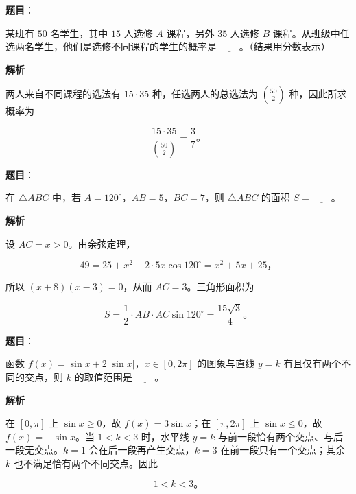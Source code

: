 \begin{answer}

\textbf{题目}：

某班有 $50$ 名学生，其中 $15$ 人选修 $A$ 课程，另外 $35$ 人选修 $B$ 课程。从班级中任选两名学生，他们是选修不同课程的学生的概率是 $\underline{\qquad}$。（结果用分数表示）

\textbf{解析}

两人来自不同课程的选法有 $15\cdot35$ 种，任选两人的总选法为 $\binom{50}{2}$ 种，因此所求概率为

\nopagebreak[4]
\[
\frac{15\cdot35}{\binom{50}{2}}=\frac37\mbox{。}
\]


\end{answer}
\begin{answer}

\textbf{题目}：

在 $\triangle ABC$ 中，若 $A=120^\circ$，$AB=5$，$BC=7$，则 $\triangle ABC$ 的面积 $S=\underline{\qquad}$。

\textbf{解析}

设 $AC=x>0$。由余弦定理，

\nopagebreak[4]
\[
49=25+x^2-2\cdot5x\cos120^\circ=x^2+5x+25\text{，}
\]

所以 $(x+8)(x-3)=0$，从而 $AC=3$。三角形面积为

\nopagebreak[4]
\[
S=\frac12\cdot AB\cdot AC\sin120^\circ=\frac{15\sqrt3}{4}\mbox{。}
\]


\end{answer}
\begin{answer}

\textbf{题目}：

函数 $f(x)=\sin x+2|\sin x|$，$x\in[0,2\pi]$ 的图象与直线 $y=k$ 有且仅有两个不同的交点，则 $k$ 的取值范围是 $\underline{\qquad}$。

\textbf{解析}

在 $[0,\pi]$ 上 $\sin x\ge0$，故 $f(x)=3\sin x$；在 $[\pi,2\pi]$ 上 $\sin x\le0$，故 $f(x)=-\sin x$。当 $1<k<3$ 时，水平线 $y=k$ 与前一段恰有两个交点、与后一段无交点。$k=1$ 会在后一段再产生交点，$k=3$ 在前一段只有一个交点；其余 $k$ 也不满足恰有两个不同交点。因此

\nopagebreak[4]
\[
1<k<3\mbox{。}
\]


\end{answer}
